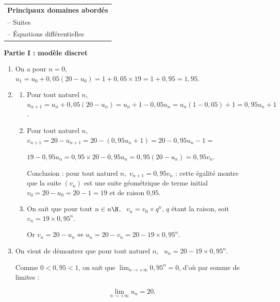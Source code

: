 \medskip

\begin{tabular}{|l|}\hline
\textbf{Principaux domaines abordés}\\
-- Suites\\
-- Équations différentielles\\ \hline
\end{tabular}







\bigskip

\textbf{Partie I : modèle discret}

\medskip









\medskip

\begin{enumerate}
\item 
On a pour $n = 0$, \, $u_1 = u_0 + 0,05(20 - u_0) = 1 + 0,05 \times 19 = 1 + 0,95 = 1,95$.
\item 
	\begin{enumerate}
		\item 
Pour tout naturel $n$, \, $u_{n+1} = u_n + 0,05\left(20 - u_n\right) = u_n  + 1 - 0,05u_n = u_n(1 - 0,05) + 1 = 0,95u_n + 1$.
		\item 
		

Pour tout naturel $n$, \, $v_{n+1} = 20 - u_{n+1} = 20 - \left(0,95u_n + 1\right) = 20 - 0,95u_n - 1 = $

$19 - 0,95u_n = 0,95 \times  20 - 0,95u_n = 0,95\left(20 - u_n \right) = 0,95v_n$.

Conclusion : pour tout naturel $n$,\, $v_{n+1} = 0,95v_n$ : cette égalité montre que la suite $\left(v_n\right)$ est une suite géométrique de terme initial $v_0 =  20 - u_0 =  20 - 1 = 19$ et de raison 0,95.
		\item 
On sait que pour tout $n \in n\N$, \, $v_n = v_0 \times q^n$, $q$ étant la raison, soit $v_n = 19  \times 0,95^n$.

Or $v_n = 20 - u_n \iff u_n = 20 - v_n = 20 - 19 \times 0,95^n$.
	\end{enumerate}
\item 
On vient de démontrer que pour tout naturel $n$, \, $u_n = 20 - 19\times 0,95^n$.

Comme $0 < 0,95 < 1$, on sait que $\displaystyle\lim_{n \to + \infty} 0,95^n = 0$, d'où par somme de limites :

\[\displaystyle\lim_{n \to + \infty} u_n = 20.\]
\end{enumerate}

